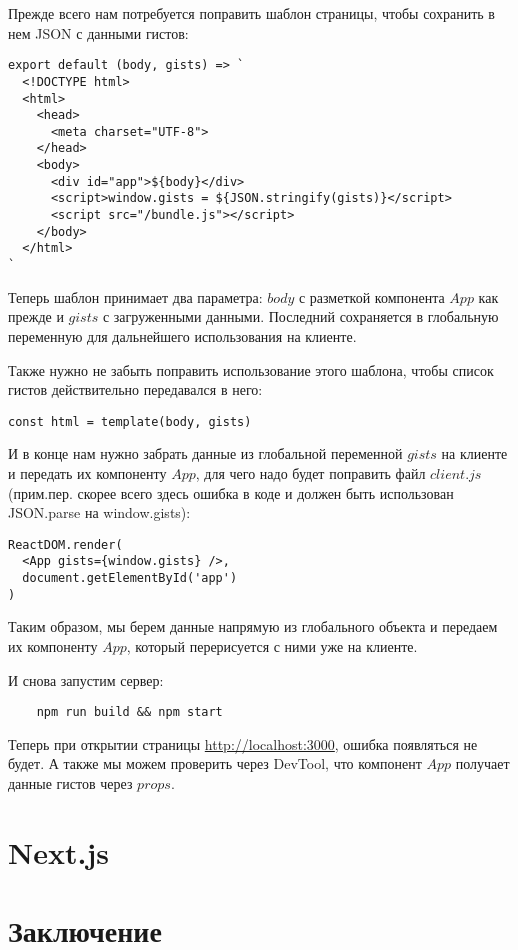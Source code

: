 Прежде всего нам потребуется поправить шаблон страницы, чтобы сохранить в нем JSON с данными гистов:

\begin{lstlisting}
export default (body, gists) => `
  <!DOCTYPE html>
  <html>
    <head>
      <meta charset="UTF-8">
    </head>
    <body>
      <div id="app">${body}</div>
      <script>window.gists = ${JSON.stringify(gists)}</script>
      <script src="/bundle.js"></script>
    </body>
  </html>
`
\end{lstlisting}

Теперь шаблон принимает два параметра: $body$ с разметкой компонента $App$ как прежде и $gists$ с загруженными данными. Последний сохраняется в глобальную переменную для дальнейшего использования на клиенте.

Также нужно не забыть поправить использование этого шаблона, чтобы список гистов действительно передавался в него:

\begin{lstlisting}
const html = template(body, gists)
\end{lstlisting}

И в конце нам нужно забрать данные из глобальной переменной $gists$ на клиенте и передать их компоненту $App$, для чего надо будет поправить файл $client.js$ (прим.пер. скорее всего здесь ошибка в коде и должен быть использован JSON.parse на window.gists):

\begin{lstlisting}
ReactDOM.render(
  <App gists={window.gists} />,
  document.getElementById('app')
)
\end{lstlisting}

Таким образом, мы берем данные напрямую из глобального объекта и передаем их компоненту $App$, который перерисуется с ними уже на клиенте.

И снова запустим сервер:

\begin{lstlisting}
	npm run build && npm start
\end{lstlisting}

Теперь при открытии страницы \href{http://localhost:3000}{http://localhost:3000}, ошибка появляться не будет. А также мы можем проверить через DevTool, что компонент $App$ получает данные гистов через $props$.

\section{Next.js}

\section{Заключение}









